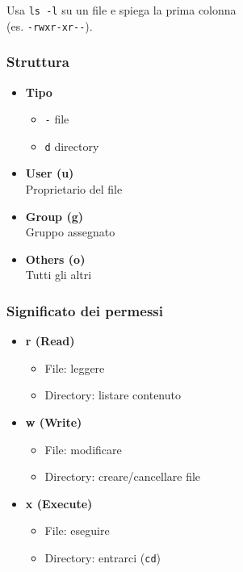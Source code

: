 \documentclass[11pt,a4paper]{article}
\providecommand{\tightlist}{%
  \setlength{\itemsep}{0pt}\setlength{\parskip}{0pt}}
\begin{document}
Usa \texttt{ls\ -l} su un file e spiega la prima colonna\\
(es. \texttt{-rwxr-xr-\/-}).

\subsubsection{Struttura}\label{struttura}

\begin{itemize}
\item
  \textbf{Tipo}

  \begin{itemize}
  \tightlist
  \item
    \texttt{-} file
  \item
    \texttt{d} directory
  \end{itemize}
\item
  \textbf{User (u)}\\
  Proprietario del file
\item
  \textbf{Group (g)}\\
  Gruppo assegnato
\item
  \textbf{Others (o)}\\
  Tutti gli altri
\end{itemize}

\subsubsection{Significato dei permessi}\label{significato-dei-permessi}

\begin{itemize}
\tightlist
\item
  \textbf{r (Read)}

  \begin{itemize}
  \tightlist
  \item
    File: leggere\\
  \item
    Directory: listare contenuto
  \end{itemize}
\item
  \textbf{w (Write)}

  \begin{itemize}
  \tightlist
  \item
    File: modificare\\
  \item
    Directory: creare/cancellare file
  \end{itemize}
\item
  \textbf{x (Execute)}

  \begin{itemize}
  \tightlist
  \item
    File: eseguire\\
  \item
    Directory: entrarci (\texttt{cd})
  \end{itemize}
\end{itemize}
\end{document}
